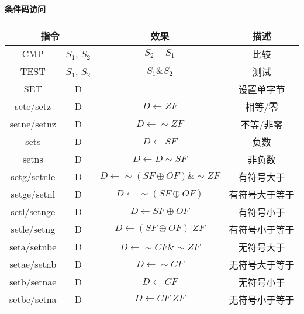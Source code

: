\paragraph{条件码访问}
\begin{table}[H]
    \centering
    \begin{tabular}{|c c|c|c|}
        \hline
        \multicolumn{2}{|c|}{\textbf{指令}} & \textbf{效果} & \textbf{描述} \\
        \hline
        CMP & $S_1$, $S_2$ & $S_2-S_1$ & 比较 \\
        \hline
        TEST & $S_1$, $S_2$ & $S_1 \& S_2$ & 测试 \\
        \hline
        SET & D & & 设置单字节 \\
        \hline
        sete/setz & D & $D \leftarrow ZF$ & 相等/零 \\
        setne/setnz & D & $D \leftarrow \sim ZF$ & 不等/非零 \\
        \hline
        sets & D & $D \leftarrow SF$ & 负数 \\
        setns & D & $D \leftarrow D \sim SF$ & 非负数 \\
        \hline
        setg/setnle & D & $D \leftarrow \sim (SF \oplus OF) \& \sim ZF$ & 有符号大于 \\
        setge/setnl & D & $D \leftarrow \sim (SF \oplus OF)$ & 有符号大于等于 \\
        setl/setnge & D & $D \leftarrow SF \oplus OF$ & 有符号小于 \\
        setle/setng & D & $D \leftarrow (SF \oplus OF) | ZF$ & 有符号小于等于 \\
        \hline
        seta/setnbe & D & $D \leftarrow \sim CF \& \sim ZF$ & 无符号大于 \\
        setae/setnb & D & $D \leftarrow \sim CF$ & 无符号大于等于 \\
        setb/setnae & D & $D \leftarrow CF$ & 无符号小于 \\
        setbe/setna & D & $D \leftarrow CF | ZF$ & 无符号小于等于 \\
        \hline
    \end{tabular}
\end{table}

